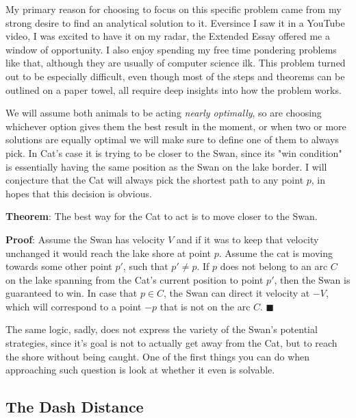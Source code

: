 \documentclass[12pt]{article}
\begin{document}
My primary reason for choosing to focus on this specific problem came from my strong desire to find an analytical solution to it. Eversince I saw it in a YouTube video\cite{Catandmouse}, I was excited to have it on my radar, the Extended Essay offered me a window of opportunity. I also enjoy spending my free time pondering problems like that, although they are usually of computer science ilk. This problem turned out to be especially difficult, even though most of the steps and theorems can be outlined on a paper towel, all require deep insights into how the problem works.

We will assume both animals to be acting \textit{nearly optimally}, so are choosing whichever option gives them the best result in the moment, or when two or more solutions are equally optimal we will make sure to define one of them to always pick. In Cat's case it is trying to be closer to the Swan, since its "win condition" is essentially having the same position as the Swan on the lake border. I will conjecture that the Cat will always pick the shortest path to any point $p$, in hopes that this decision is obvious.

\textbf{Theorem}: The best way for the Cat to act is to move closer to the Swan.

\textbf{Proof}: Assume the Swan has velocity $V$ and if it was to keep that velocity unchanged it would reach the lake shore at point $p$. Assume the cat is moving towards some other point $p'$, such that $p' \neq p$. If $p$ does not belong to an arc $C$ on the lake spanning from the Cat's current position to point $p'$, then the Swan is guaranteed to win. In case that $p \in C$, the Swan can direct it velocity at $-V$, which will correspond to a point $-p$ that is not on the arc $C$. $\blacksquare$

The same logic, sadly, does not express the variety of the Swan's potential strategies, since it's goal is not to actually get away from the Cat, but to reach the shore without being caught. One of the first things you can do when approaching such question is look at whether it even is solvable.

\begin{center}
\end{center}

\subsection{The Dash Distance}
\end{document}

